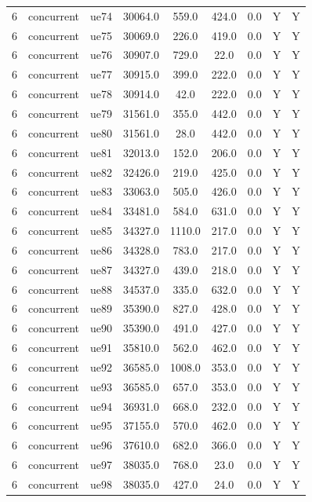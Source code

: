 \begin{table}[ht]
\begin{tabular}{|c|c|c|c|c|c|c|c|c|}
6 & concurrent & ue74 & 30064.0 & 559.0 & 424.0 & 0.0 & Y & Y \\
6 & concurrent & ue75 & 30069.0 & 226.0 & 419.0 & 0.0 & Y & Y \\
6 & concurrent & ue76 & 30907.0 & 729.0 & 22.0 & 0.0 & Y & Y \\
6 & concurrent & ue77 & 30915.0 & 399.0 & 222.0 & 0.0 & Y & Y \\
6 & concurrent & ue78 & 30914.0 & 42.0 & 222.0 & 0.0 & Y & Y \\
6 & concurrent & ue79 & 31561.0 & 355.0 & 442.0 & 0.0 & Y & Y \\
6 & concurrent & ue80 & 31561.0 & 28.0 & 442.0 & 0.0 & Y & Y \\
6 & concurrent & ue81 & 32013.0 & 152.0 & 206.0 & 0.0 & Y & Y \\
6 & concurrent & ue82 & 32426.0 & 219.0 & 425.0 & 0.0 & Y & Y \\
6 & concurrent & ue83 & 33063.0 & 505.0 & 426.0 & 0.0 & Y & Y \\
6 & concurrent & ue84 & 33481.0 & 584.0 & 631.0 & 0.0 & Y & Y \\
6 & concurrent & ue85 & 34327.0 & 1110.0 & 217.0 & 0.0 & Y & Y \\
6 & concurrent & ue86 & 34328.0 & 783.0 & 217.0 & 0.0 & Y & Y \\
6 & concurrent & ue87 & 34327.0 & 439.0 & 218.0 & 0.0 & Y & Y \\
6 & concurrent & ue88 & 34537.0 & 335.0 & 632.0 & 0.0 & Y & Y \\
6 & concurrent & ue89 & 35390.0 & 827.0 & 428.0 & 0.0 & Y & Y \\
6 & concurrent & ue90 & 35390.0 & 491.0 & 427.0 & 0.0 & Y & Y \\
6 & concurrent & ue91 & 35810.0 & 562.0 & 462.0 & 0.0 & Y & Y \\
6 & concurrent & ue92 & 36585.0 & 1008.0 & 353.0 & 0.0 & Y & Y \\
6 & concurrent & ue93 & 36585.0 & 657.0 & 353.0 & 0.0 & Y & Y \\
6 & concurrent & ue94 & 36931.0 & 668.0 & 232.0 & 0.0 & Y & Y \\
6 & concurrent & ue95 & 37155.0 & 570.0 & 462.0 & 0.0 & Y & Y \\
6 & concurrent & ue96 & 37610.0 & 682.0 & 366.0 & 0.0 & Y & Y \\
6 & concurrent & ue97 & 38035.0 & 768.0 & 23.0 & 0.0 & Y & Y \\
6 & concurrent & ue98 & 38035.0 & 427.0 & 24.0 & 0.0 & Y & Y \\

\end{tabular}
\end{table}
